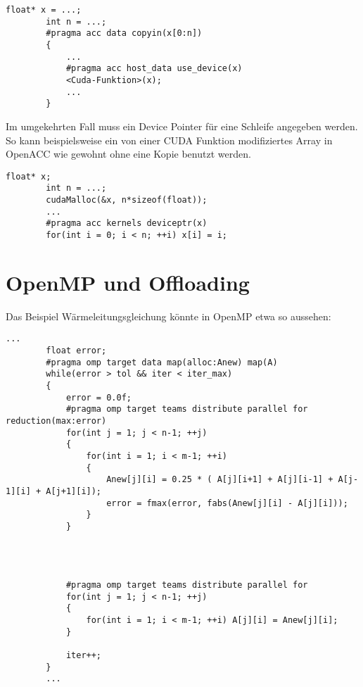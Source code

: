 		\begin{lstlisting}[caption=OpenACC/CUDA Zusammenspiel: Host Memory]
		float* x = ...;
		int n = ...;
		#pragma acc data copyin(x[0:n])
		{
			...
			#pragma acc host_data use_device(x)
			<Cuda-Funktion>(x);
			...
		}
		\end{lstlisting}

		Im umgekehrten Fall muss ein Device Pointer für eine Schleife angegeben werden. So kann beispielsweise ein von einer CUDA Funktion modifiziertes Array in OpenACC wie gewohnt ohne eine Kopie benutzt werden.
		
		\begin{lstlisting}[caption=OpenACC/CUDA Zusammenspiel: Device Memory]
		float* x;
		int n = ...;
		cudaMalloc(&x, n*sizeof(float));
		...
		#pragma acc kernels deviceptr(x)
		for(int i = 0; i < n; ++i) x[i] = i;
		\end{lstlisting}
			
		\section{OpenMP und Offloading}
		Das Beispiel Wärmeleitungsgleichung könnte in OpenMP etwa so aussehen:
		
		\begin{lstlisting}[caption=OpenMP: Offloading]
		...
		float error;
		#pragma omp target data map(alloc:Anew) map(A)
		while(error > tol && iter < iter_max)
		{
			error = 0.0f;
			#pragma omp target teams distribute parallel for reduction(max:error)
			for(int j = 1; j < n-1; ++j)
			{
				for(int i = 1; i < m-1; ++i)
				{
					Anew[j][i] = 0.25 * ( A[j][i+1] + A[j][i-1] + A[j-1][i] + A[j+1][i]);
					error = fmax(error, fabs(Anew[j][i] - A[j][i]));
				}
			}
			
			
			
			
			#pragma omp target teams distribute parallel for
			for(int j = 1; j < n-1; ++j)
			{
				for(int i = 1; i < m-1; ++i) A[j][i] = Anew[j][i];
			}
			
			iter++;
		}
		...
		\end{lstlisting}
